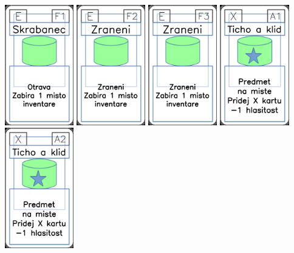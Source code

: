 \documentclass[a4paper]{article}
\begin{document}
	\includegraphics[width=3.0cm]{img-4_55}
	\includegraphics[width=3.0cm]{img-4_56}
	\includegraphics[width=3.0cm]{img-4_57}
	\includegraphics[width=3.0cm]{img-5_0}
	\includegraphics[width=3.0cm]{img-5_1}
\end{document}
